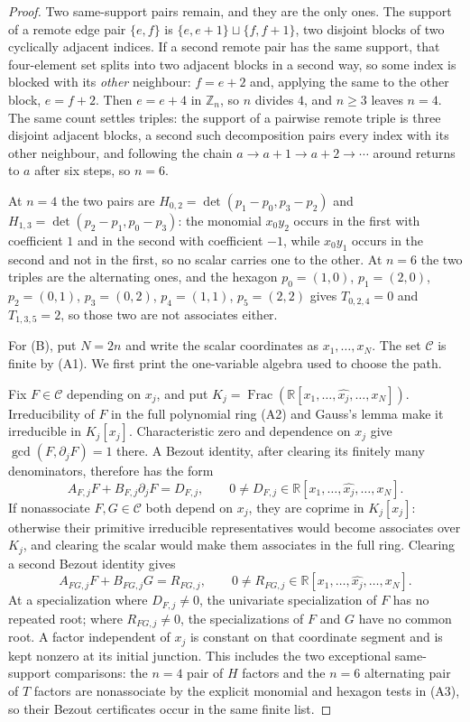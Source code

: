 \begin{proof}
Two same-support pairs remain, and they are the only ones. The support of a
remote edge pair $\{e,f\}$ is $\{e,e+1\}\sqcup\{f,f+1\}$, two disjoint blocks of
two cyclically adjacent indices. If a second remote pair has the same support,
that four-element set splits into two adjacent blocks in a second way, so some
index is blocked with its \emph{other} neighbour: $f=e+2$ and, applying the same
to the other block, $e=f+2$. Then $e=e+4$ in $\mathbb Z_n$, so $n$ divides $4$,
and $n\geq3$ leaves $n=4$. The same count settles triples: the support of a
pairwise remote triple is three disjoint adjacent blocks, a second such
decomposition pairs every index with its other neighbour, and following the
chain $a\to a+1\to a+2\to\cdots$ around returns to $a$ after six steps, so
$n=6$.

At $n=4$ the two pairs are
$H_{0,2}=\det(p_1-p_0,p_3-p_2)$ and $H_{1,3}=\det(p_2-p_1,p_0-p_3)$: the
monomial $x_0y_2$ occurs in the first with coefficient $1$ and in the second
with coefficient $-1$, while $x_0y_1$ occurs in the second and not in the first,
so no scalar carries one to the other. At $n=6$ the two triples are the
alternating ones, and the hexagon
$p_0=(1,0)$, $p_1=(2,0)$, $p_2=(0,1)$, $p_3=(0,2)$, $p_4=(1,1)$, $p_5=(2,2)$
gives $T_{0,2,4}=0$ and $T_{1,3,5}=2$, so those two are not associates either.


For (B), put $N=2n$ and write the scalar coordinates as $x_1,\ldots,x_N$. The set
$\mathcal C$ is finite by (A1). We first print the
one-variable algebra used to choose the path.

Fix $F\in\mathcal C$ depending on $x_j$, and put
$K_j=\operatorname{Frac}(\mathbb R[x_1,\ldots,\widehat{x_j},\ldots,x_N])$.
Irreducibility of $F$ in the full polynomial ring
(A2) and Gauss's lemma make it irreducible in
$K_j[x_j]$. Characteristic zero and dependence on $x_j$ give
$\gcd(F,\partial_jF)=1$ there. A Bezout identity, after clearing its finitely
many denominators, therefore has the form
\[
 A_{F,j}F+B_{F,j}\partial_jF=D_{F,j},
 \qquad 0\neq D_{F,j}\in
 \mathbb R[x_1,\ldots,\widehat{x_j},\ldots,x_N].
\]
If nonassociate $F,G\in\mathcal C$ both depend on $x_j$, they are coprime in
$K_j[x_j]$: otherwise their primitive irreducible representatives would become
associates over $K_j$, and clearing the scalar would make them associates in
the full ring. Clearing a second Bezout identity gives
\[
 A_{FG,j}F+B_{FG,j}G=R_{FG,j},
 \qquad 0\neq R_{FG,j}\in
 \mathbb R[x_1,\ldots,\widehat{x_j},\ldots,x_N].
\]
At a specialization where $D_{F,j}\neq0$, the univariate specialization of
$F$ has no repeated root; where $R_{FG,j}\neq0$, the specializations of $F$
and $G$ have no common root. A factor independent of $x_j$ is constant on that
coordinate segment and is kept nonzero at its initial junction. This includes
the two exceptional same-support comparisons: the $n=4$ pair of $H$ factors
and the $n=6$ alternating pair of $T$ factors are nonassociate by the explicit
monomial and hexagon tests in (A3), so their Bezout
certificates occur in the same finite list.


\end{proof}
